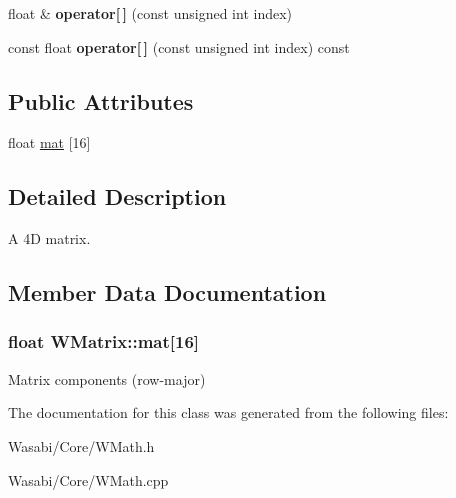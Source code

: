 \begin{DoxyCompactItemize}
\item 
float \& {\bfseries operator\mbox{[}$\,$\mbox{]}} (const unsigned int index)\hypertarget{class_w_matrix_a72f442646a5078dca447b411c98358ea}{}\label{class_w_matrix_a72f442646a5078dca447b411c98358ea}

\item 
const float {\bfseries operator\mbox{[}$\,$\mbox{]}} (const unsigned int index) const \hypertarget{class_w_matrix_ae4feef61fae0a9c253820e0201425d57}{}\label{class_w_matrix_ae4feef61fae0a9c253820e0201425d57}

\end{DoxyCompactItemize}
\subsection*{Public Attributes}
\begin{DoxyCompactItemize}
\item 
float \hyperlink{class_w_matrix_a3103a31e4270d2a0997fa895dcfe3e52}{mat} \mbox{[}16\mbox{]}
\end{DoxyCompactItemize}


\subsection{Detailed Description}
A 4D matrix. 

\subsection{Member Data Documentation}
\subsubsection[{\texorpdfstring{mat}{mat}}]{\setlength{\rightskip}{0pt plus 5cm}float W\+Matrix\+::mat\mbox{[}16\mbox{]}}\hypertarget{class_w_matrix_a3103a31e4270d2a0997fa895dcfe3e52}{}\label{class_w_matrix_a3103a31e4270d2a0997fa895dcfe3e52}
Matrix components (row-\/major) 

The documentation for this class was generated from the following files\+:\begin{DoxyCompactItemize}
\item 
Wasabi/\+Core/W\+Math.\+h\item 
Wasabi/\+Core/W\+Math.\+cpp\end{DoxyCompactItemize}
